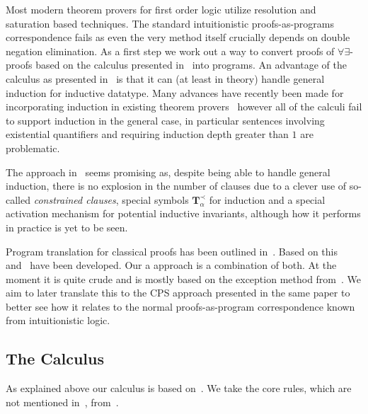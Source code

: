 \documentclass[onehalfspacing]{article}
\begin{document}
Most modern theorem provers for first order logic utilize resolution and saturation based techniques. The standard intuitionistic proofs-as-programs correspondence fails as even the very method itself crucially depends on double negation elimination. As a first step we work out a way to convert proofs of $\forall\exists$-proofs based on the calculus presented in~\cite{Echenim_2019} into programs. An advantage of the calculus as presented in~\cite{Echenim_2019} is that it can (at least in theory) handle general induction for inductive datatype. Many advances have recently been made for incorporating induction in existing theorem provers~\cite{hajdu2021automating}\cite{10.1007/978-3-030-53518-6_8} however all of the calculi fail to support induction in the general case, in particular sentences involving existential quantifiers and requiring induction depth greater than $1$ are problematic.

The approach in~\cite{Echenim_2019} seems promising as, despite being able to handle general induction, there is no explosion in the number of clauses due to a clever use of so-called \textit{constrained clauses}, special symbols $\textbf{T}_\alpha^\prec$ for induction and a special activation mechanism for potential inductive invariants, although how it performs in practice is yet to be seen.

Program translation for classical proofs has been outlined in~\cite{Griffin_1990}. Based on this~\cite{de_Groote_1995} and~\cite{Barbanera_1996} have been developed. Our a approach is a combination of both. At the moment it is quite crude and is mostly based on the exception method from~\cite{de_Groote_1995}. We aim to later translate this to the CPS approach presented in the same paper to better see how it relates to the normal proofs-as-program correspondence known from intuitionistic logic.



\subsection{The Calculus}

As explained above our calculus is based on~\cite{Echenim_2019}. We take the core rules, which are not mentioned in~\cite{Echenim_2019}, from~\cite{Kov_cs_2013}.
\end{document}
